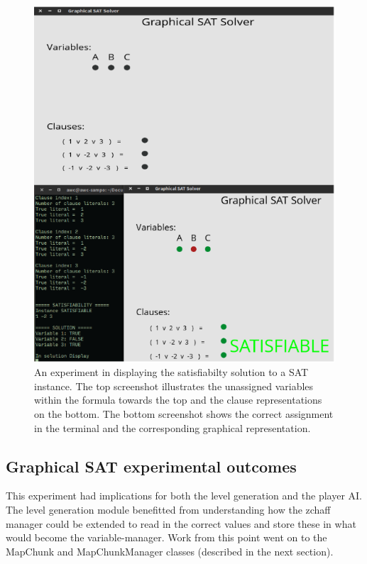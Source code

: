 \documentclass[11pt, a4paper, oneside]{report} %
\begin{document}
\begin{figure}[ht!]

  \centering     \includegraphics[scale=0.4]{graphicalSAT}   \caption{An
experiment in displaying the satisfiabilty solution to a SAT instance. The top
screenshot illustrates the unassigned variables within the formula towards the
top and the clause representations on the bottom. The bottom screenshot shows
the correct assignment in the terminal and the corresponding graphical
representation.}   \label{graphicalSAT} \end{figure}

\subsection{Graphical SAT experimental outcomes}

This experiment had implications for both the level generation and the player
AI. The level generation module benefitted from understanding how the zchaff
manager could be extended to read in the correct values and store these in what
would become the variable-manager. Work from this point went on to the MapChunk
and MapChunkManager classes (described in the next section).
\end{document}

